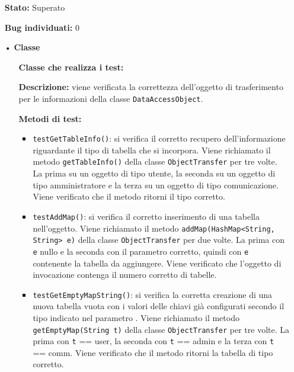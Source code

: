 {{\begin{itemize}
\begin{itemize}
					\item[] \textbf{Stato:} Superato

					\item[] \textbf{Bug individuati:} 0
				\end{itemize}	
			\end{itemize}
			
			\begin{itemize}
				\item[•]\textbf{Classe } 
				\begin{itemize}
					\item[] \textbf{Classe che realizza i test:} \\ 

					\item[] \textbf{Descrizione:} viene verificata la correttezza dell'oggetto di trasferimento per le informazioni della classe \texttt{DataAccessObject}.

					\item[] \textbf{Metodi di test:}
					\begin{itemize}
						\item \texttt{testGetTableInfo()}: si verifica il corretto recupero dell'informazione riguardante il tipo di tabella che si incorpora. Viene richiamato il metodo \texttt{getTableInfo()} della classe \texttt{ObjectTransfer} per tre volte. La prima su un oggetto di tipo utente, la seconda su un oggetto di tipo amministratore e la terza su un oggetto di tipo comunicazione. Viene verificato che il metodo ritorni il tipo corretto.
						
						\item \texttt{testAddMap()}: si verifica il corretto inserimento di una tabella nell'oggetto. Viene richiamato il metodo \newline \texttt{addMap(HashMap<String, String> e)} della classe \texttt{ObjectTransfer} per due volte. La prima con \texttt{e} nullo e la seconda con il parametro corretto, quindi con \texttt{e} contenente la tabella da aggiungere. Viene verificato che l'oggetto di invocazione contenga il numero corretto di tabelle.
						
						\item \texttt{testGetEmptyMapString()}: si verifica la corretta creazione di una nuova tabella vuota con i valori delle chiavi già configurati secondo il tipo indicato nel parametro . Viene richiamato il metodo \newline \texttt{getEmptyMap(String t)} della classe \texttt{ObjectTransfer} per tre volte. La prima con \texttt{t} == user, la seconda con \texttt{t} == admin e la terza con \texttt{t} == comm. Viene verificato che il metodo ritorni la tabella di tipo corretto.
						

\end{itemize}
\end{itemize}
\end{itemize}}}

